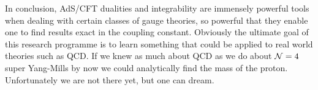 In conclusion, AdS/CFT dualities and integrability are immensely powerful tools when dealing with certain classes of gauge theories, so powerful that they enable one to find results exact in the coupling constant.
Obviously the ultimate goal of this research programme is to learn something that could be applied to real world theories such as QCD.
If we knew as much about QCD as we do about $\mathcal{N}=4$ super Yang-Mills by now we could analytically find the mass of the proton.
Unfortunately we are not there yet, but one can dream.





